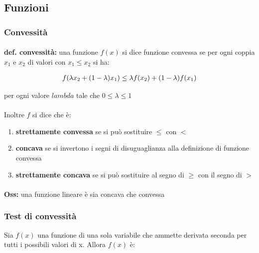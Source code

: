 \documentclass[a4paper, 11pt]{article}
\begin{document}
        


    \subsection{Funzioni}
        \subsubsection{Convessità}
            \paragraph{}
            \textbf{def. convessità:} una funzione $f(x)$ si dice funzione convessa se per ogni coppia $x_1$ e $x_2$ di valori con $x_1 \le x_2$ si ha:
            
            \begin{align}
                f(\lambda x_2 + (1- \lambda) x_1) \le \lambda f(x_2) + (1-\lambda)f(x_1) \notag
            \end{align}

            per ogni valore $lambda$ tale che $0 \le \lambda \le 1$

            \paragraph{} Inoltre $f$ si dice che è:
            \begin{enumerate}
                \item \textbf{strettamente convessa} se si può sostituire $\le$ con $<$
                \item \textbf{concava} se si invertono i segni di disuguaglianza alla definizione di funzione convessa
                \item \textbf{strettamente concava} se si può sostituire al segno di $\ge$ con il segno di $>$ 
            \end{enumerate}

            \paragraph{}
            \textbf{Oss: } una funzione lineare è sia concava che convessa

            \subsubsection*{Test di convessità}
            Sia $f(x)$ una funzione di una sola variabile che ammette derivata seconda per tutti i possibili valori di x. Allora $f(x)$ è:
            
\end{document}
